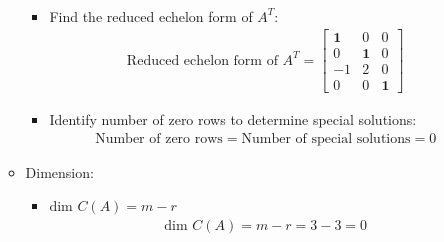 \documentclass[10pt,a4paper]{article}
\begin{document}
\begin{enumerate}
\begin{itemize}
\begin{itemize}
\begin{align*}
            \end{align*}
            \item Find the reduced echelon form of $A^T$:
            \begin{align*}
                \text{Reduced echelon form of }A^T = 
                \begin{bmatrix}
                    \textbf{1}&0&0 \\
                    0&\textbf{1}&0 \\
                    -1&2&0 \\
                    0&0&\textbf{1}
                \end{bmatrix}
            \end{align*}
            \item Identify number of zero rows to determine special solutions:
            \begin{align*}
                \text{Number of zero rows} = \text{Number of special solutions} = 0
            \end{align*}
        \end{itemize}
        \item Dimension:
        \begin{itemize}
            \item $\text{dim }C(A) = m-r$
            \begin{align*}
                \text{dim }C(A) = m-r = 3-3 = 0
            \end{align*}
        \end{itemize}
    \end{itemize}
\end{enumerate}



\end{document}
